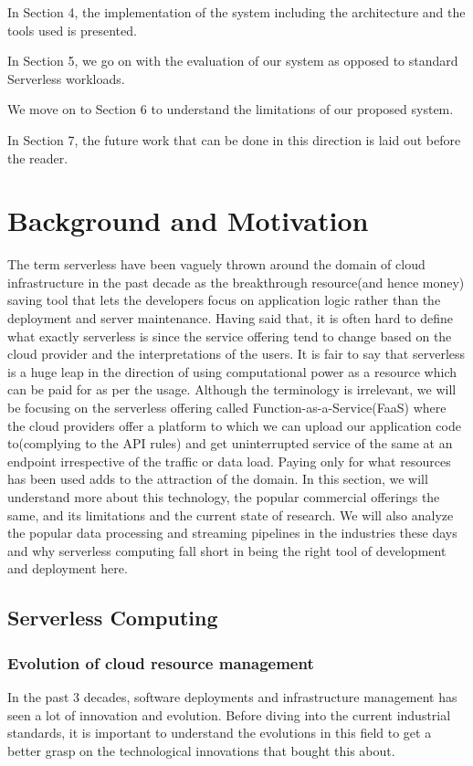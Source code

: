 \documentclass[12pt]{article}
\begin{document}
In Section 4, the implementation of the system including the architecture and
the tools used is presented.

In Section 5, we go on with the evaluation of our system as opposed to standard
Serverless workloads.

We move on to Section 6 to understand the limitations of our proposed system.

In Section 7, the future work that can be done in this direction is laid out
before the reader.

\section{Background and Motivation}
\label{sec:org0795100}
The term serverless have been vaguely thrown around the domain of cloud
infrastructure in the past decade as the breakthrough resource(and hence money)
saving tool that lets the developers focus on application logic rather than the
deployment and server maintenance. Having said that, it is often hard to define
what exactly serverless is since the service offering tend to change based on
the cloud provider and the interpretations of the users. It is fair to say that
serverless is a huge leap in the direction of using computational power as a
resource which can be paid for as per the usage.
Although the terminology is irrelevant, we will be focusing on the serverless
offering called Function-as-a-Service(FaaS) where the cloud providers offer a
platform to which we can upload our application code to(complying to the API
rules) and get uninterrupted service of the same at an endpoint irrespective of
the traffic or data load. Paying only for what resources has been used adds to
the attraction of the domain.
In this section, we will understand more about this technology, the
popular commercial offerings the same, and its limitations and the current state
of research. 
We will also analyze the popular data processing and streaming pipelines in the
industries these days and why serverless computing fall short in being the right
tool of development and deployment here.
\subsection{Serverless Computing}
\label{sec:org16a5650}
\subsubsection{Evolution of cloud resource management}
\label{sec:org5b6a8a6}
In the past 3 decades, software deployments and infrastructure management has
seen a lot of innovation and evolution. Before diving into the current
industrial standards, it is important to understand the evolutions in this field
to get a better grasp on the technological innovations that bought this about.
\end{document}
